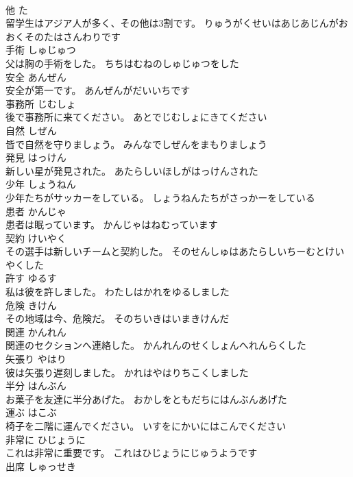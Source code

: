 \documentclass[8pt]{extreport}
\begin{document}
\begin{CJK}{UTF8}{min}
\\	他	た	
\\	留学生はアジア人が多く、その他は3割です。	りゅうがくせいはあじあじんがおおくそのたはさんわりです	
\\	手術	しゅじゅつ	
\\	父は胸の手術をした。	ちちはむねのしゅじゅつをした	
\\	安全	あんぜん	
\\	安全が第一です。	あんぜんがだいいちです	
\\	事務所	じむしょ	
\\	後で事務所に来てください。	あとでじむしょにきてください	
\\	自然	しぜん	
\\	皆で自然を守りましょう。	みんなでしぜんをまもりましょう	
\\	発見	はっけん	
\\	新しい星が発見された。	あたらしいほしがはっけんされた	
\\	少年	しょうねん	
\\	少年たちがサッカーをしている。	しょうねんたちがさっかーをしている	
\\	患者	かんじゃ	
\\	患者は眠っています。	かんじゃはねむっています	
\\	契約	けいやく	
\\	その選手は新しいチームと契約した。	そのせんしゅはあたらしいちーむとけいやくした	
\\	許す	ゆるす	
\\	私は彼を許しました。	わたしはかれをゆるしました	
\\	危険	きけん	
\\	その地域は今、危険だ。	そのちいきはいまきけんだ	
\\	関連	かんれん	
\\	関連のセクションへ連絡した。	かんれんのせくしょんへれんらくした	
\\	矢張り	やはり	
\\	彼は矢張り遅刻しました。	かれはやはりちこくしました	
\\	半分	はんぶん	
\\	お菓子を友達に半分あげた。	おかしをともだちにはんぶんあげた	
\\	運ぶ	はこぶ	
\\	椅子を二階に運んでください。	いすをにかいにはこんでください	
\\	非常に	ひじょうに	
\\	これは非常に重要です。	これはひじょうにじゅうようです	
\\	出席	しゅっせき	

\end{CJK}
\end{document}
